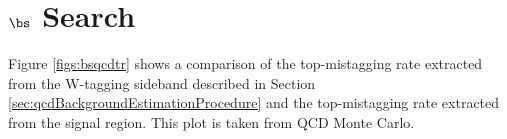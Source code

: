 




\section{$\bs$ Search}
\label{sec:appendix}
Figure \ref{figs:bsqcdtr} shows a comparison of the top-mistagging rate extracted from the W-tagging sideband described in Section \ref{sec:qcdBackgroundEstimationProcedure} and the top-mistagging rate extracted from the signal region.  
This plot is taken from QCD Monte Carlo.

